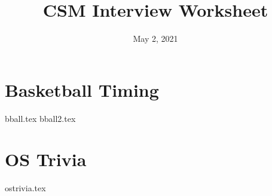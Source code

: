 \documentclass[11pt]{exam}
\title{CSM Interview Worksheet}
\date{May 2, 2021}
\begin{document}
\maketitle

\section{Basketball Timing}
\begin{questions}
{bball.tex}
{bball2.tex}
\end{questions}
\newpage

\section{OS Trivia}
\begin{questions}
{ostrivia.tex}
\end{questions}
\newpage
\end{document}

